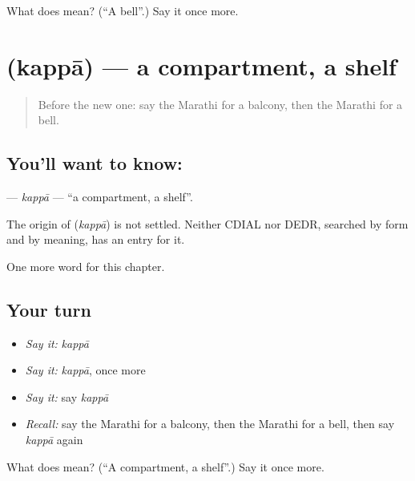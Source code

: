 \begin{tcolorbox}[breakable,colback=teal!4,colframe=teal!35!black,title={Before you move on}]
What does  mean? (\textquotedblleft{}A bell\textquotedblright{}.) Say it once more.
\end{tcolorbox}
\section[\texorpdfstring{\mr{कप्पा} (kappā)}{कप्पा (kappā)}]{ (kappā) — a compartment, a shelf}

\label{lesson:MR-C178-kappa}



\begin{quote}
Before the new one: say the Marathi for a balcony, then the Marathi for a bell.
\end{quote}

\subsection*{You'll want to know: }
\textbf{} — \emph{kappā} — \textquotedblleft{}a compartment, a shelf\textquotedblright{}.

\begin{cousinweb}
The origin of \textbf{} (\emph{kappā}) is not settled. Neither CDIAL nor DEDR, searched by form and by meaning, has an entry for it.
\end{cousinweb}

\begin{grammarlens}[title={What you've built}]
One more word for this chapter.
\end{grammarlens}

\subsection*{Your turn}
\begin{itemize}
\raggedright
  \item \emph{Say it:} \emph{kappā}
  \item \emph{Say it:} \emph{kappā}, once more
  \item \emph{Say it:} say \emph{kappā}
  \item \emph{Recall:} say the Marathi for a balcony, then the Marathi for a bell, then say \emph{kappā} again
\end{itemize}

\begin{tcolorbox}[breakable,colback=teal!4,colframe=teal!35!black,title={Before you move on}]
What does  mean? (\textquotedblleft{}A compartment, a shelf\textquotedblright{}.) Say it once more.
\end{tcolorbox}
